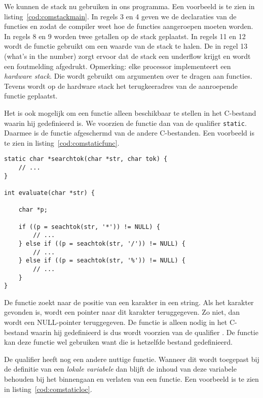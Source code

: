 We kunnen de stack nu gebruiken in ons programma. Een voorbeeld is te zien in listing~\ref{cod:comstackmain}. In regels 3 en 4 geven we de declaraties van de functies  en  zodat de compiler weet hoe de functies aangeroepen moeten worden. In regels 8 en 9 worden twee getallen op de stack geplaatst. In regels 11 en 12 wordt de functie  gebruikt om een waarde van de stack te halen. De  in regel 13 (what's in the number) zorgt ervoor dat de stack een underflow krijgt en wordt een foutmelding afgedrukt. Opmerking: elke processor implementeert een \textsl{hardware stack}. Die wordt gebruikt om argumenten over te dragen aan functies. Tevens wordt op de hardware stack het terugkeeradres van de aanroepende functie geplaatst.

Het is ook mogelijk om een functie alleen beschikbaar te stellen in het C-bestand waarin hij gedefinieerd is. We voorzien de functie dan van de qualifier \texttt{static}. Daarmee is de functie afgeschermd van de andere C-bestanden. Een voorbeeld is te zien in listing~\ref{cod:comstaticfunc}.

\begin{lstlisting}[caption=Gebruik van een static globale variabele.,label=cod:comstaticfunc]
static char *searchtok(char *str, char tok) {
    // ...
}

int evaluate(char *str) {
    
    char *p;
    
    if ((p = seachtok(str, '*')) != NULL) {
        // ...
    } else if ((p = seachtok(str, '/')) != NULL) {
        // ...
    } else if ((p = seachtok(str, '%')) != NULL) {
        // ...
    }
}
\end{lstlisting}

De functie  zoekt naar de positie van een karakter in een string. Als het karakter gevonden is, wordt een pointer naar dit karakter teruggegeven. Zo niet, dan wordt een NULL-pointer teruggegeven.  De functie is alleen nodig in het C-bestand waarin hij gedefinieerd is dus wordt  voorzien van de qualifier . De functie  kan deze functie wel gebruiken want die is hetzelfde bestand gedefinieerd.

De qualifier  heeft nog een andere nuttige functie. Wanneer dit wordt toegepast bij de definitie van een \textsl{lokale variabele} dan blijft de inhoud van deze variabele behouden bij het binnengaan en verlaten van een functie. Een voorbeeld is te zien in listing~\ref{cod:comstaticloc}.

